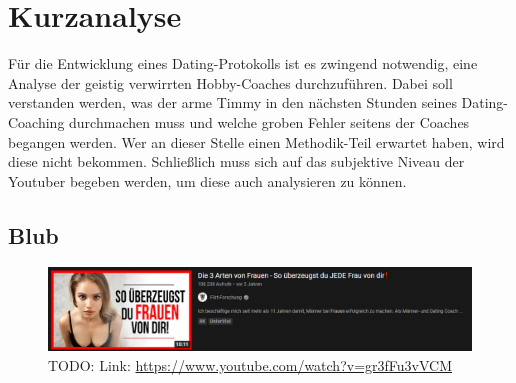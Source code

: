 \chapter{Kurzanalyse}
\label{chapter-analyse}

Für die Entwicklung eines Dating-Protokolls ist es zwingend notwendig, eine Analyse der geistig verwirrten Hobby-Coaches durchzuführen.
Dabei soll verstanden werden, was der arme Timmy in den nächsten Stunden seines Dating-Coaching durchmachen muss und welche groben Fehler seitens der Coaches begangen werden.
Wer an dieser Stelle einen Methodik-Teil erwartet haben, wird diese nicht bekommen.
Schließlich muss sich auf das subjektive Niveau der Youtuber begeben werden, um diese auch analysieren zu können.

\section{Blub}


\begin{figure}
    \centering
    \includegraphics[scale=0.4]{Sources/clickbait.png}
    \caption{TODO: Link: \url{https://www.youtube.com/watch?v=gr3fFu3vVCM}}
    \label{fig:analyse-clickbait}
\end{figure}